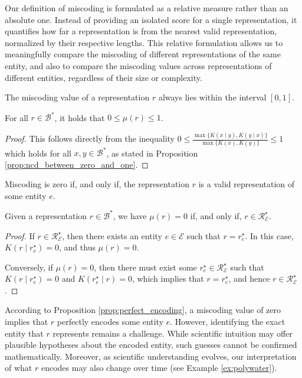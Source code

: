 Our definition of miscoding is formulated as a relative measure rather than an absolute one. Instead of providing an isolated score for a single representation, it quantifies how far a representation is from the nearest valid representation, normalized by their respective lengths. This relative formulation allows us to meaningfully compare the miscoding of different representations of the same entity, and also to compare the miscoding values across representations of different entities, regardless of their size or complexity.

The miscoding value of a representation $r$ always lies within the interval $[0, 1]$.

\begin{proposition}
\label{prop:range_miscoding}
For all $r \in \mathcal{B}^\ast$, it holds that $0 \leq \mu(r) \leq 1$.
\end{proposition}
\begin{proof}
This follows directly from the inequality $0 \leq \frac{ \max\{ K(x \mid y), K(y \mid x) \} }{ \max\{ K(x), K(y) \} } \leq 1$ which holds for all $x, y \in \mathcal{B}^\ast$, as stated in Proposition \ref{prop:ncd_between_zero_and_one}.
\end{proof}

Miscoding is zero if, and only if, the representation $r$ is a valid representation of some entity $e$.

\begin{proposition}
\label{prop:perfect_encoding}
Given a representation $r \in \mathcal{B}^\ast$, we have $\mu(r) = 0$ if, and only if, $r \in \mathcal{R}^\star_\mathcal{E}$.
\end{proposition}
\begin{proof}
If $r \in \mathcal{R}^\star_\mathcal{E}$, then there exists an entity $e \in \mathcal{E}$ such that $r = r^\star_e$. In this case, $K \left( r \mid r^\star_e \right) = 0$, and thus $\mu(r) = 0$.

Conversely, if $\mu(r) = 0$, then there must exist some $r^\star_e \in \mathcal{R}^\star_\mathcal{E}$ such that $K \left( r \mid r^\star_e \right) = 0$ and $K \left( r^\star_e \mid r \right) = 0$, which implies that $r = r^\star_e$, and hence $r \in \mathcal{R}^\star_\mathcal{E}$.
\end{proof}

According to Proposition \ref{prop:perfect_encoding}, a miscoding value of zero implies that $r$ perfectly encodes some entity $e$. However, identifying the exact entity that $r$ represents remains a challenge. While scientific intuition may offer plausible hypotheses about the encoded entity, such guesses cannot be confirmed mathematically. Moreover, as scientific understanding evolves, our interpretation of what $r$ encodes may also change over time (see Example \ref{ex:polywater}).

